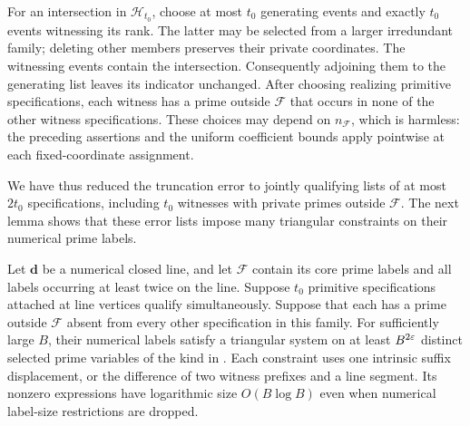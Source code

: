 For an intersection in $\mathscr H_{t_0}$, choose at most $t_0$
generating events and exactly $t_0$ events witnessing its rank.  The
latter may be selected from a larger irredundant family; deleting other
members preserves their private coordinates.  The witnessing events
contain the intersection.  Consequently adjoining them to the
generating list leaves its indicator unchanged.  After choosing
realizing primitive specifications, each witness has a prime outside
$\mathcal F$ that occurs in none of the other witness specifications.
These choices may depend on $n_{\mathcal F}$, which is harmless:
the preceding assertions and the uniform coefficient bounds apply
pointwise at each fixed-coordinate assignment.

We have thus reduced the truncation error to jointly qualifying lists
of at most $2t_0$ specifications, including $t_0$ witnesses with private
primes outside $\mathcal F$.  The next lemma shows that these error
lists impose many triangular constraints on their numerical prime
labels.

\begin{lemma}\label{lem:cylinder-witnesses}
Let $\boldsymbol d$ be a numerical closed line, and let $\mathcal F$ contain
its core prime labels and all labels occurring at least twice on the
line.  Suppose $t_0$ primitive specifications attached at line vertices
qualify simultaneously.  Suppose that each has a prime outside
$\mathcal F$ absent from every other specification in this family.
For sufficiently large $B$, their numerical labels satisfy a triangular
system on at least $B^{2\varepsilon}$ distinct selected prime variables of the
kind in .  Each constraint uses one intrinsic
suffix displacement, or the difference of two witness prefixes and a
line segment.  Its nonzero expressions have logarithmic size
$O(B\log B)$ even when numerical label-size restrictions are dropped.
\end{lemma}

